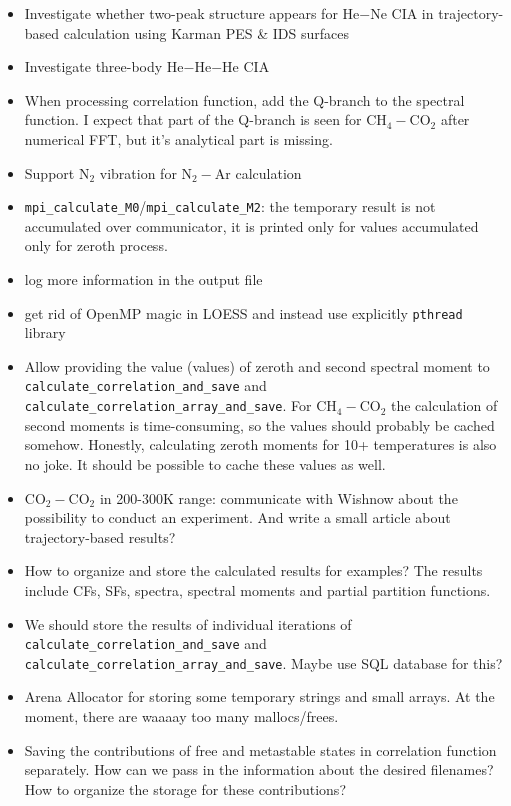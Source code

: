 \documentclass[color]{article}
\begin{document}
\begin{itemize}
    \item Investigate whether two-peak structure appears for He$-$Ne CIA in trajectory-based calculation using Karman PES \& IDS surfaces
    \item Investigate three-body He$-$He$-$He CIA \cite{Kowalski2014}
    \item When processing correlation function, add the Q-branch to the spectral function. I expect that part of the Q-branch is seen for CH$_4-$CO$_2$ after numerical FFT, but it's analytical part is missing. 
    \item Support N$_2$ vibration for N$_2-$Ar calculation 
    \item \texttt{mpi\_calculate\_M0}/\texttt{mpi\_calculate\_M2}: the temporary result is not accumulated over communicator, it is printed only for values accumulated only for zeroth process.
    \item log more information in the output file
    \item get rid of OpenMP magic in LOESS and instead use explicitly \texttt{pthread} library 
    \item Allow providing the value (values) of zeroth and second spectral moment to \texttt{calculate\_correlation\_and\_save} and \texttt{calculate\_correlation\_array\_and\_save}. {\color{red} For CH$_4-$CO$_2$ the calculation of second moments is time-consuming, so the values should probably be cached somehow. Honestly, calculating zeroth moments for 10+ temperatures is also no joke. It should be possible to cache these values as well.}
    \item CO$_2-$CO$_2$ in 200-300K range: communicate with Wishnow about the possibility to conduct an experiment. And write a small article about trajectory-based results?
    \item How to organize and store the calculated results for examples? The results include CFs, SFs, spectra, spectral moments and partial partition functions.
    \item We should store the results of individual iterations of \texttt{calculate\_correlation\_and\_save} and \texttt{calculate\_correlation\_array\_and\_save}. Maybe use SQL database for this?
    \item Arena Allocator for storing some temporary strings and small arrays. At the moment, there are waaaay too many mallocs/frees. 
    \item Saving the contributions of free and metastable states in correlation function separately. How can we pass in the information about the desired filenames? How to organize the storage for these contributions? 

\end{itemize}
\end{document}

